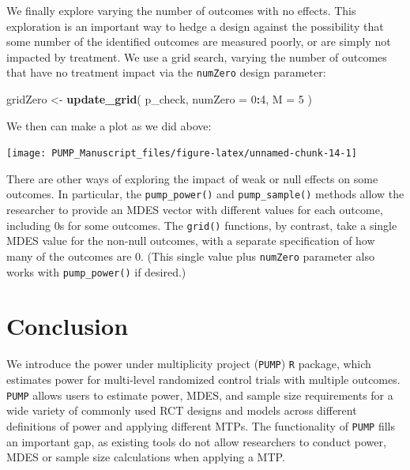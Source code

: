 \documentclass[
]{article}
\newenvironment{Shaded}{\begin{snugshade}}{\end{snugshade}}
\newcommand{\DataTypeTok}[1]{\textcolor[rgb]{0.13,0.29,0.53}{#1}}
\newcommand{\DecValTok}[1]{\textcolor[rgb]{0.00,0.00,0.81}{#1}}
\newcommand{\KeywordTok}[1]{\textcolor[rgb]{0.13,0.29,0.53}{\textbf{#1}}}
\newcommand{\NormalTok}[1]{#1}
\newcommand{\OperatorTok}[1]{\textcolor[rgb]{0.81,0.36,0.00}{\textbf{#1}}}
\newcommand{\StringTok}[1]{\textcolor[rgb]{0.31,0.60,0.02}{#1}}
\begin{document}
We finally explore varying the number of outcomes with no effects. This
exploration is an important way to hedge a design against the
possibility that some number of the identified outcomes are measured
poorly, or are simply not impacted by treatment. We use a grid search,
varying the number of outcomes that have no treatment impact via the
\texttt{numZero} design parameter:

\begin{Shaded}
\begin{Highlighting}[]
\NormalTok{gridZero \textless{}{-}}\StringTok{ }\KeywordTok{update\_grid}\NormalTok{( p\_check,}
            \DataTypeTok{numZero =} \DecValTok{0}\OperatorTok{:}\DecValTok{4}\NormalTok{,}
            \DataTypeTok{M =} \DecValTok{5}\NormalTok{ )}
\end{Highlighting}
\end{Shaded}

We then can make a plot as we did above:

\begin{center}\texttt{[image: PUMP\_Manuscript\_files/figure-latex/unnamed-chunk-14-1]} \end{center}

There are other ways of exploring the impact of weak or null effects on
some outcomes. In particular, the \texttt{pump\_power()} and
\texttt{pump\_sample()} methods allow the researcher to provide an MDES
vector with different values for each outcome, including 0s for some
outcomes. The \texttt{grid()} functions, by contrast, take a single MDES
value for the non-null outcomes, with a separate specification of how
many of the outcomes are 0. (This single value plus \texttt{numZero}
parameter also works with \texttt{pump\_power()} if desired.)

\section{Conclusion}
\label{sec:conclusion}

We introduce the power under multiplicity project (\texttt{PUMP})
\texttt{R} package, which estimates power for multi-level randomized
control trials with multiple outcomes. \texttt{PUMP} allows users to
estimate power, MDES, and sample size requirements for a wide variety of
commonly used RCT designs and models across different definitions of
power and applying different MTPs. The functionality of \texttt{PUMP}
fills an important gap, as existing tools do not allow researchers to
conduct power, MDES or sample size calculations when applying a MTP.
\end{document}
